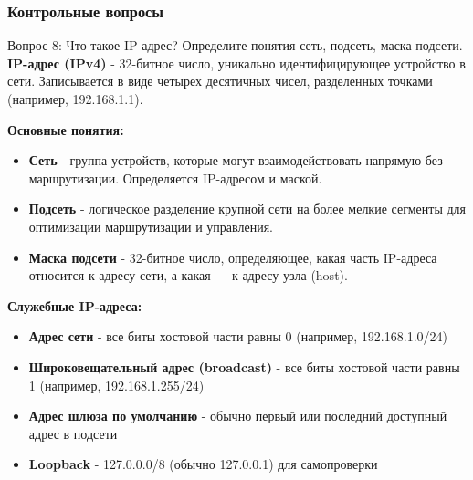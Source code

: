 \begin{frame}
\frametitle{Контрольные вопросы}
\begin{block}{Вопрос 8: Что такое IP-адрес? Определите понятия сеть, подсеть, маска подсети.}
\textbf{IP-адрес (IPv4)} - 32-битное число, уникально идентифицирующее устройство в сети. Записывается в виде четырех десятичных чисел, разделенных точками (например, 192.168.1.1).
\vspace{0.2cm}

\textbf{Основные понятия:}
\begin{itemize}
    \item \textbf{Сеть} - группа устройств, которые могут взаимодействовать напрямую без маршрутизации. Определяется IP-адресом и маской.
    \item \textbf{Подсеть} - логическое разделение крупной сети на более мелкие сегменты для оптимизации маршрутизации и управления.
    \item \textbf{Маска подсети} - 32-битное число, определяющее, какая часть IP-адреса относится к адресу сети, а какая — к адресу узла (host).
\end{itemize}

\textbf{Служебные IP-адреса:}
\begin{itemize}
    \item \textbf{Адрес сети} - все биты хостовой части равны 0 (например, 192.168.1.0/24)
    \item \textbf{Широковещательный адрес (broadcast)} - все биты хостовой части равны 1 (например, 192.168.1.255/24)
    \item \textbf{Адрес шлюза по умолчанию} - обычно первый или последний доступный адрес в подсети
    \item \textbf{Loopback} - 127.0.0.0/8 (обычно 127.0.0.1) для самопроверки
\end{itemize}
\end{block}
\end{frame}

